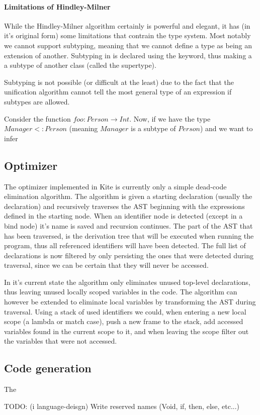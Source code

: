 \paragraph{Limitations of Hindley-Milner}
While the Hindley-Milner algorithm certainly is powerful and elegant, it has (in it's original form) some limitations that contrain the type system. Most notably we cannot support subtyping, meaning that we cannot define a type as being an extension of another. Subtyping in  is declared using the  keyword, thus making a  a subtype of another class (called the supertype).

Subtyping is not possible (or difficult at the least) due to the fact that the unification algorithm cannot tell the most general type of an expression if subtypes are allowed.

Consider the function $foo : Person \to Int$. Now, if we have the type $Manager <: Person$ (meaning $Manager$ is a subtype of $Person$) and we want to infer %



\subsection{Optimizer}

The optimizer implemented in Kite is currently only a simple dead-code elimination algorithm. The algorithm is given a starting declaration (usually the  declaration) and recursively traverses the AST beginning with the expressions defined in the starting node. When an identifier node is detected (except in a bind node) it's name is saved and recursion continues. The part of the AST that has been traversed, is the derivation tree that will be executed when running the program, thus all referenced identifiers will have been detected. The full list of declarations is now filtered by only persisting the ones that were detected during traversal, since we can be certain that they will never be accessed.

In it's current state the algorithm only eliminates unused top-level declarations, thus leaving unused locally scoped variables in the code. The algorithm can however be extended to eliminate local variables by transforming the AST during traversal. Using a stack of used identifiers we could, when entering a new local scope (a lambda or match case), push a new frame to the stack, add accessed variables found in the current scope to it, and when leaving the scope filter out the variables that were not accessed.

\subsection{Code generation}

The

TODO: (i language-deisgn) Write reserved names (Void, if, then, else, etc...)



